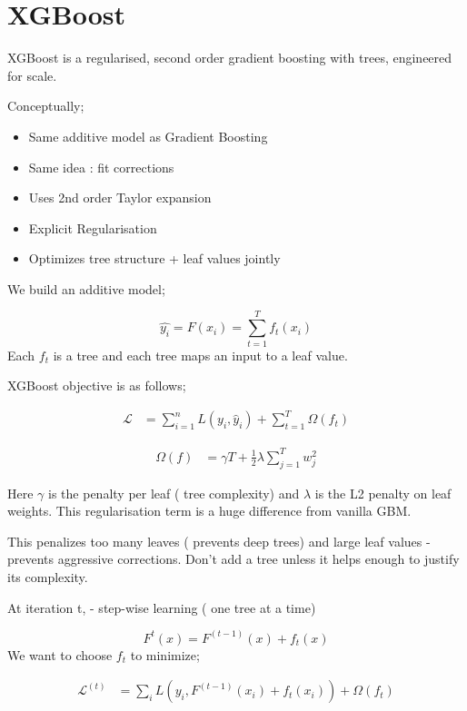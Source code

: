 \documentclass[10pt,a4paper]{article}
\begin{document}
		\section{XGBoost}
	
		XGBoost is a regularised, second order gradient boosting with trees, engineered for scale.
	
		Conceptually;
	
		\begin{itemize}
			\item Same additive model as Gradient Boosting
			\item Same idea : fit corrections
			\item Uses 2nd order Taylor expansion
			\item Explicit Regularisation
			\item Optimizes tree structure + leaf values jointly
		\end{itemize}
	
		We build an additive model;
	
		$$	\hat{y_i} = F(x_i) = \sum_{t=1}^{T} f_t(x_i)
		$$
		Each $f_t$ is a tree and each tree maps an input to a leaf value.
	
		XGBoost objective is as follows;
	
	
		\begin{align*}\mathcal{L}&=\sum_{i=1}^n L(y_i, \hat{y}_i)+\sum_{t=1}^T \Omega(f_t)\end{align*}
	
	
		\begin{align*}\Omega(f)&=\gamma T+\frac{1}{2}\lambda \sum_{j=1}^T w_j^2\end{align*}
	
	
		Here $\gamma$ is the penalty per leaf ( tree complexity) and $\lambda$ is the L2 penalty on leaf weights. This regularisation term is a huge difference from vanilla GBM.
	
		This penalizes too many leaves ( prevents deep trees) and large leaf values - prevents aggressive corrections. Don’t add a tree unless it helps enough to justify its complexity.
	
		At iteration t, - step-wise learning ( one tree at a time)
	
		$$	F^{t}(x) = F^{(t-1)}(x) + f_t(x)
		$$
		We want to choose $f_t$ to minimize;
	
	
		\begin{align*}
			\mathcal{L}^{(t)}&=\sum_i L\left(y_i, F^{(t-1)}(x_i) + f_t(x_i)\right)+\Omega(f_t)
		\end{align*}
	
\end{document}
